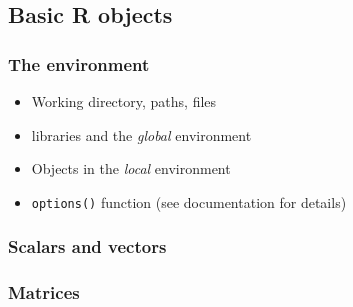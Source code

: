 \documentclass{beamer}
\begin{document}
\subsection{Basic R objects}

\begin{frame}[fragile]
    \frametitle{The environment}
    \begin{itemize}
      \pause
      \item Working directory, paths, files
      \pause
      \item libraries and the \emph{global} environment
      \pause
      \item Objects in the \emph{local} environment
      \pause
      \item \texttt{options()} function (see documentation for details)
      \pause
    \end{itemize}
    
\end{frame}


\begin{frame}[fragile]
    \frametitle{Scalars and vectors}
    
\end{frame}


\begin{frame}[fragile]
    \frametitle{Matrices}
    
\end{frame}
\end{document}
